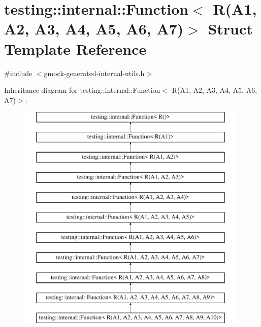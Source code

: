 \hypertarget{structtesting_1_1internal_1_1Function_3_01R_07A1_00_01A2_00_01A3_00_01A4_00_01A5_00_01A6_00_01A7_08_4}{}\section{testing\+::internal\+::Function$<$ R(A1, A2, A3, A4, A5, A6, A7)$>$ Struct Template Reference}
\label{structtesting_1_1internal_1_1Function_3_01R_07A1_00_01A2_00_01A3_00_01A4_00_01A5_00_01A6_00_01A7_08_4}


{\ttfamily \#include $<$gmock-\/generated-\/internal-\/utils.\+h$>$}

Inheritance diagram for testing\+::internal\+::Function$<$ R(A1, A2, A3, A4, A5, A6, A7)$>$\+:\begin{figure}[H]
\begin{center}
\leavevmode
\includegraphics[height=11.000000cm]{structtesting_1_1internal_1_1Function_3_01R_07A1_00_01A2_00_01A3_00_01A4_00_01A5_00_01A6_00_01A7_08_4}
\end{center}
\end{figure}
